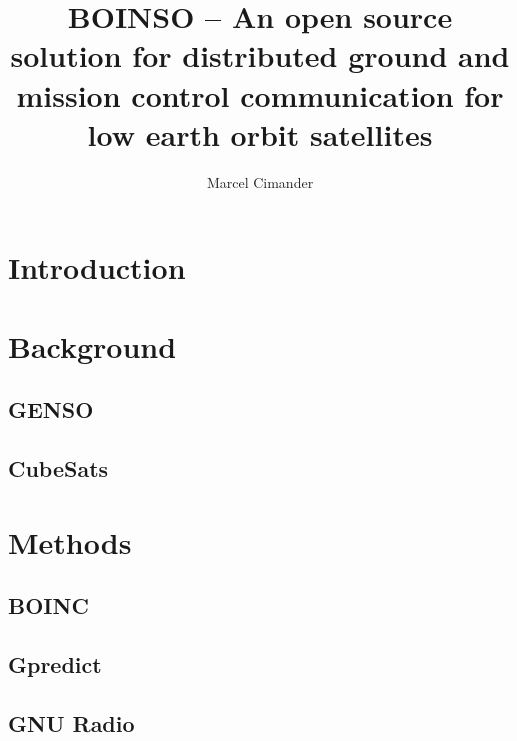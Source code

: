 \documentclass[Bachelor, BBE, english]{twbook}
\title{BOINSO -- An open source solution for distributed ground and mission control communication for low earth orbit satellites}
\author{Marcel Cimander}
\begin{document}
\maketitle

\chapter{Introduction}
	
	
\newpage
\chapter{Background}
	\section{\acf{GENSO}}	
		
	\section{CubeSats}
		

\newpage
\chapter{Methods}
	
	\section{\acf{BOINC}}
		
	\section{Gpredict} \label{sec:gpred_label}
		
		\newpage
	\section{GNU Radio}
		
	




\newpage
\listoffigures
\end{document}

